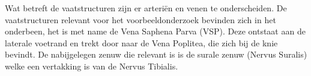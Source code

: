 Wat betreft de vaatstructuren zijn er arteri\"{e}n en venen te onderscheiden. De vaatstructuren relevant voor het voorbeeldonderzoek bevinden zich in het onderbeen, het is met name de Vena Saphena Parva (VSP). Deze ontstaat aan de laterale voetrand en trekt door naar de Vena Poplitea, die zich bij de knie bevindt. De nabijgelegen zenuw die relevant is is de surale zenuw (Nervus Suralis) welke een vertakking is van de Nervus Tibialis.


